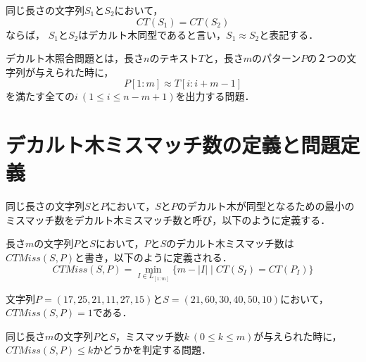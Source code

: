 \begin{definition}[デカルト木同型]
  同じ長さの文字列$S_1$と$S_2$において，
  \[CT(S_1)=CT(S_2)\]ならば，
  $S_1$と$S_2$はデカルト木同型であると言い，$S_1 \approx S_2$と表記する．
\end{definition}

\begin{definition}
  デカルト木照合問題とは，長さ$n$のテキスト$T$と，長さ$m$のパターン$P$の２つの文字列が与えられた時に，
  \begin{displaymath}
    P[1:m] \approx T[i:i+m-1]
  \end{displaymath}
  を満たす全ての$i\ (1 \leq i \leq n-m+1)$を出力する問題．
\end{definition}

\section{デカルト木ミスマッチ数の定義と問題定義}
同じ長さの文字列$S$と$P$において，$S$と$P$のデカルト木が同型となるための最小のミスマッチ数をデカルト木ミスマッチ数と呼び，以下のように定義する．
\begin{definition}[デカルト木ミスマッチ数]
  長さ$m$の文字列$P$と$S$において，$P$と$S$のデカルト木ミスマッチ数は$CTMiss(S,P)$と書き，以下のように定義される．
  \begin{displaymath}
    CTMiss(S,P)=\min_{I\in L_{[1:m]}}\{m-|I|\mid CT(S_{I})=CT(P_{I})\}
  \end{displaymath}
\end{definition}

\begin{example}
  文字列$P=(17,25,21,11,27,15)$と$S=(21, 60, 30, 40, 50, 10)$において，$CTMiss(S,P)=1$である．
\end{example}

  \begin{problem}[$k$ミスマッチデカルト木決定問題]
    同じ長さ$m$の文字列$P$と$S$，ミスマッチ数$k\ (0\leq k \leq m)$が与えられた時に，$CTMiss(S,P)\leq k$かどうかを判定する問題．
  \end{problem}
